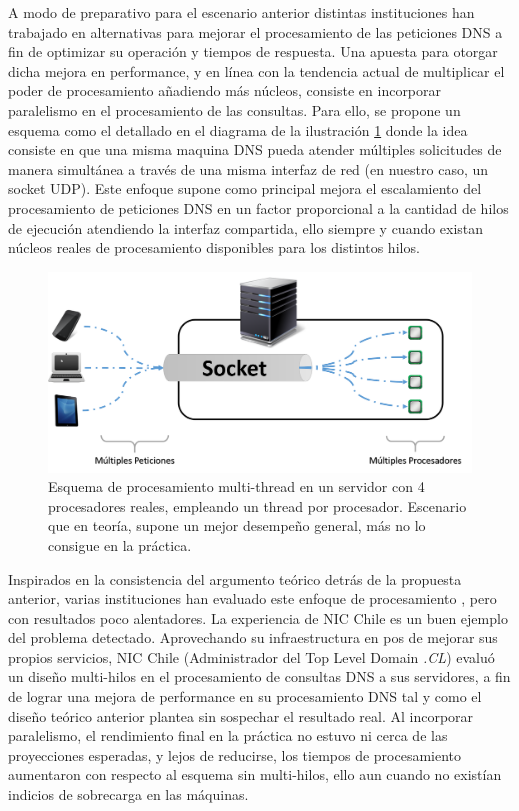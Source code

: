 A modo de preparativo para el escenario anterior distintas instituciones han trabajado en alternativas para mejorar el procesamiento de las peticiones DNS a fin de optimizar su operación y tiempos de respuesta. Una apuesta para otorgar dicha mejora en performance, y en línea con la tendencia actual de multiplicar el poder de procesamiento añadiendo más núcleos, consiste en incorporar paralelismo en el procesamiento de las consultas. Para ello, se propone un esquema como el detallado en el diagrama de la ilustración \ref{fig:multi_thread} donde la idea consiste en que una misma maquina DNS pueda atender múltiples solicitudes de manera simultánea a través de una misma interfaz de red (en nuestro caso, un socket UDP). Este enfoque supone como principal mejora el escalamiento del procesamiento de peticiones DNS en un factor proporcional a la cantidad de hilos de ejecución atendiendo la interfaz compartida, ello siempre y cuando existan núcleos reales de procesamiento disponibles para los distintos hilos. 

\begin{figure}[!h]
	\centering
	\includegraphics[scale=0.45]{imagenes/conf_multi_thread}
	\caption{Esquema de procesamiento multi-thread en un servidor con 4 procesadores reales, empleando un thread por procesador. Escenario que en teoría, supone un mejor desempeño general, más no lo consigue en la práctica.}
	\label{fig:multi_thread}
\end{figure}

Inspirados en la consistencia del argumento teórico detrás de la propuesta anterior, varias instituciones han evaluado este enfoque de procesamiento \cite{post:facebook, paper:toshiba}, pero con resultados poco alentadores. La experiencia de NIC Chile es un buen ejemplo del problema detectado. Aprovechando su infraestructura en pos de mejorar sus propios servicios, NIC Chile (Administrador del Top Level Domain \emph{.CL}) evaluó un diseño multi-hilos en el procesamiento de consultas DNS a sus servidores, a fin de lograr una mejora de performance en su procesamiento DNS tal y como el diseño teórico anterior plantea sin sospechar el resultado real. Al incorporar paralelismo, el rendimiento final en la práctica no estuvo ni cerca de las proyecciones esperadas, y lejos de reducirse, los tiempos de procesamiento aumentaron con respecto al esquema sin multi-hilos, ello aun cuando no existían indicios de sobrecarga en las máquinas.

